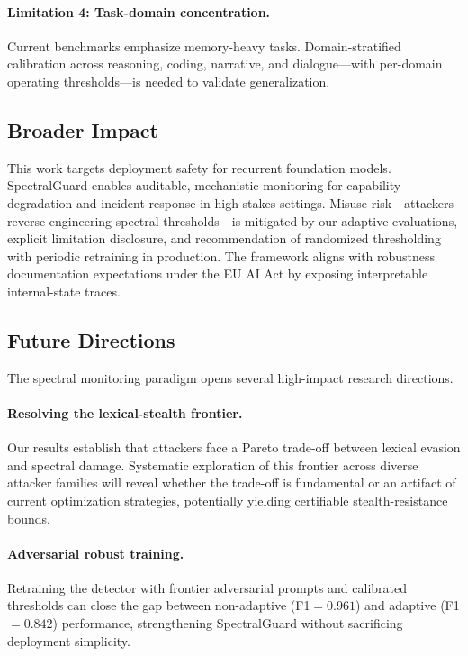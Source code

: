 \documentclass[10pt,twocolumn]{article}
\begin{document}
\paragraph{Limitation 4: Task-domain concentration.}
Current benchmarks emphasize memory-heavy tasks. Domain-stratified calibration across reasoning, coding, narrative, and dialogue---with per-domain operating thresholds---is needed to validate generalization.

\subsection{Broader Impact}

This work targets deployment safety for recurrent foundation models. SpectralGuard enables auditable, mechanistic monitoring for capability degradation and incident response in high-stakes settings. Misuse risk---attackers reverse-engineering spectral thresholds---is mitigated by our adaptive evaluations, explicit limitation disclosure, and recommendation of randomized thresholding with periodic retraining in production. The framework aligns with robustness documentation expectations under the EU AI Act by exposing interpretable internal-state traces.

\subsection{Future Directions}

The spectral monitoring paradigm opens several high-impact research directions.

\paragraph{Resolving the lexical-stealth frontier.}
Our results establish that attackers face a Pareto trade-off between lexical evasion and spectral damage. Systematic exploration of this frontier across diverse attacker families will reveal whether the trade-off is fundamental or an artifact of current optimization strategies, potentially yielding certifiable stealth-resistance bounds.

\paragraph{Adversarial robust training.}
Retraining the detector with frontier adversarial prompts and calibrated thresholds can close the gap between non-adaptive (F1$=0.961$) and adaptive (F1$=0.842$) performance, strengthening SpectralGuard without sacrificing deployment simplicity.
\end{document}
